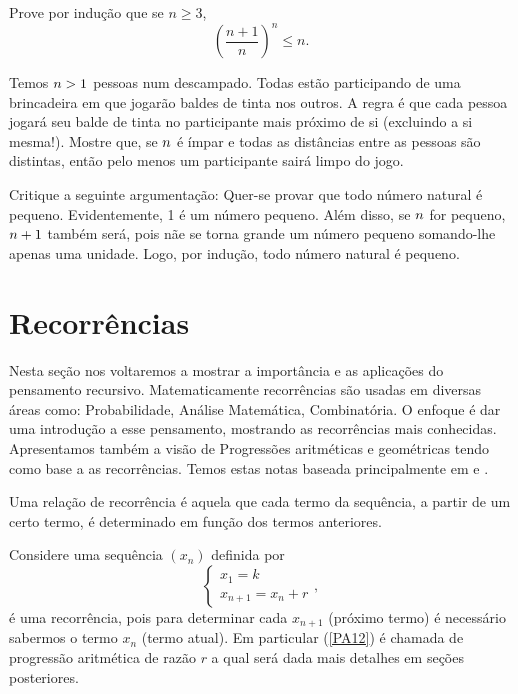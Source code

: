 \noindent [2] Prove por indução que se $n\geq 3$,
$$\left(\frac{n+1}{n}\right)^n \leq n.$$

\noindent [3] Temos $\mathnormal{n} > 1$ pessoas num descampado. Todas estão participando de uma brincadeira em que jogarão baldes de tinta nos outros. A regra é que cada pessoa jogará seu balde de tinta no participante mais próximo de si (excluindo a si mesma!). Mostre que, se $\mathnormal{n}$ é ímpar e todas as distâncias entre as pessoas são distintas, então pelo menos um participante sairá limpo do jogo.

\vspace{.5cm}

\noindent [4] Critique a seguinte argumentação: Quer-se provar que todo número natural é pequeno. Evidentemente, 1 é um número pequeno. Além disso, se $\mathnormal{n}$ for pequeno, $\mathnormal{n}+1$ também será, pois nãe se torna grande um número pequeno somando-lhe apenas uma unidade. Logo, por indução, todo número natural é pequeno.

\section{Recorrências}	
\inic  Nesta seção nos voltaremos a mostrar a importância e as aplicações do pensamento recursivo. Matematicamente recorrências são usadas em diversas áreas como: Probabilidade, Análise Matemática, Combinatória. O enfoque é dar uma introdução a esse pensamento, mostrando as recorrências mais conhecidas. Apresentamos também a visão de Progressões aritméticas e geométricas tendo como base a as recorrências. Temos estas notas baseada principalmente em \cite{Marcus} e \cite{Castro}.

\begin{defin}
	Uma relação de recorrência é aquela que cada termo da sequência, a partir de um certo termo, é determinado em função dos termos anteriores.
\end{defin}

\begin{example} Considere uma sequência $(x_n)$ definida por
	\begin{equation}
		\begin{cases}
		\label{PA12}
		x_1 = k\\
		x_{n+1} = x_n + r
		\end{cases},
	\end{equation}
	é uma recorrência, pois para determinar cada $x_{n+1}$ (próximo termo) é necessário sabermos o termo $x_n$ (termo atual). Em particular (\ref{PA12}) é chamada de progressão aritmética de razão $r$ a qual será dada mais detalhes em seções posteriores.

\end{example}
